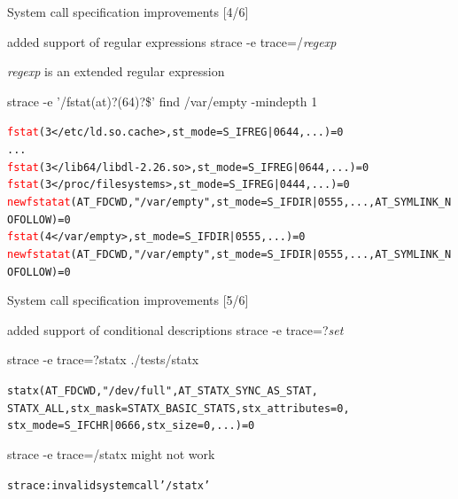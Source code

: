 \documentclass[unicode]{beamer}
\begin{document}
\begin{frame}[fragile]{System call specification improvements \hfill [4/6]}
\begin{block}{\large added support of regular expressions}
strace -e trace=/\textit{regexp}
\end{block}

\textit{regexp} is an extended regular expression

\begin{block}{\large strace -e '/fstat(at)?(64)?\$' find /var/empty -mindepth 1}
\begin{alltt}
\textcolor{red}{fstat}(3</etc/ld.so.cache>, {st_mode=S_IFREG|0644, ...}) = 0
...
\textcolor{red}{fstat}(3</lib64/libdl-2.26.so>, {st_mode=S_IFREG|0644, ...}) = 0
\textcolor{red}{fstat}(3</proc/filesystems>, {st_mode=S_IFREG|0444, ...}) = 0
\textcolor{red}{newfstatat}(AT_FDCWD, "/var/empty", {st_mode=S_IFDIR|0555, ...}, AT_SYMLINK_NOFOLLOW) = 0
\textcolor{red}{fstat}(4</var/empty>, {st_mode=S_IFDIR|0555, ...}) = 0
\textcolor{red}{newfstatat}(AT_FDCWD, "/var/empty", {st_mode=S_IFDIR|0555, ...}, AT_SYMLINK_NOFOLLOW) = 0
\end{alltt}
\end{block}
\end{frame}

\begin{frame}[fragile]{System call specification improvements \hfill [5/6]}
\begin{block}{\large added support of conditional descriptions}
strace -e trace=?\textit{set}
\end{block}
\begin{block}{\large strace -e trace=?statx ./tests/statx}
\begin{alltt}
statx(AT_FDCWD, "/dev/full", AT_STATX_SYNC_AS_STAT,
STATX_ALL, {stx_mask=STATX_BASIC_STATS, stx_attributes=0,
stx_mode=S_IFCHR|0666, stx_size=0, ...}) = 0
\end{alltt}
\end{block}
\begin{block}{\large strace -e trace=/statx might not work}
\begin{alltt}
strace: invalid system call '/statx'
\end{alltt}
\end{block}
\end{frame}
\end{document}
